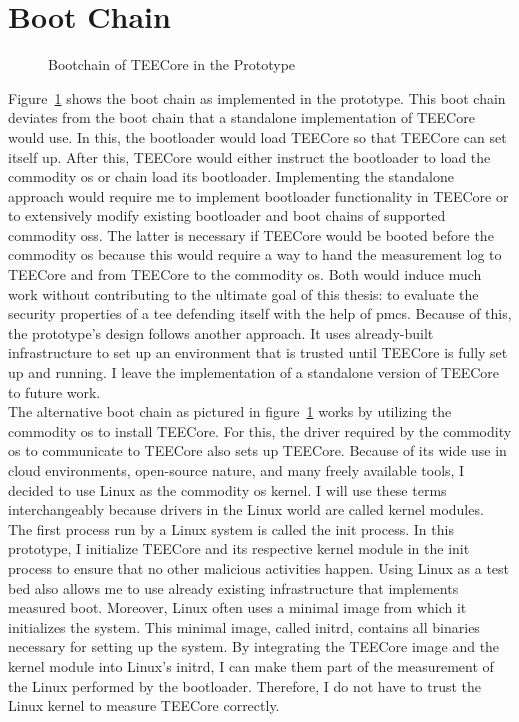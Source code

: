 \section{Boot Chain}
\label{sec:30:tee_boot_chain}
\begin{figure}
    \begin{center}
        
        \caption{Bootchain of TEECore in the Prototype}
        \label{fig:30:tee_bootchain}
    \end{center}
\end{figure}
Figure~\ref{fig:30:tee_bootchain} shows the boot chain as implemented in the
prototype. This boot chain deviates from the boot chain that a standalone
implementation of TEECore would use. In this, the bootloader would load TEECore
so that TEECore can set itself up. After this, TEECore would either instruct the
bootloader to load the commodity \gls{os} or chain load its bootloader.
Implementing the standalone approach would require me to implement bootloader
functionality in TEECore or to extensively modify existing bootloader and boot
chains of supported commodity \glspl{os}. The latter is necessary if TEECore
would be booted before the commodity \gls{os} because this would require a way
to hand the measurement log to TEECore and from TEECore to the commodity
\gls{os}. Both would induce much work without contributing to the ultimate goal
of this thesis: to evaluate the security properties of a \gls{tee} defending
itself with the help of \glspl{pmc}. Because of this, the prototype's design
follows another approach. It uses already-built infrastructure to set up an
environment that is trusted until TEECore is fully set up and running. I leave
the implementation of a standalone version of TEECore to future work.\\

The alternative boot chain as pictured in figure~\ref{fig:30:tee_bootchain}
works by utilizing the commodity \gls{os} to install TEECore. For this, the
driver required by the commodity \gls{os} to communicate to TEECore also sets up
TEECore. Because of its wide use in cloud environments, open-source nature, and
many freely available tools, I decided to use Linux as the commodity \gls{os}
kernel. I will use these terms interchangeably because drivers in the Linux
world are called kernel modules. The first process run by a Linux system is
called the init process. In this prototype, I initialize TEECore and its
respective kernel module in the init process to ensure that no other malicious
activities happen. Using Linux as a test bed also allows me to use already
existing infrastructure that implements measured boot. Moreover, Linux often
uses a minimal image from which it initializes the system. This minimal image,
called initrd, contains all binaries necessary for setting up the system. By
integrating the TEECore image and the kernel module into Linux's initrd, I can
make them part of the measurement of the Linux performed by the bootloader.
Therefore, I do not have to trust the Linux kernel to measure TEECore correctly.
\\

